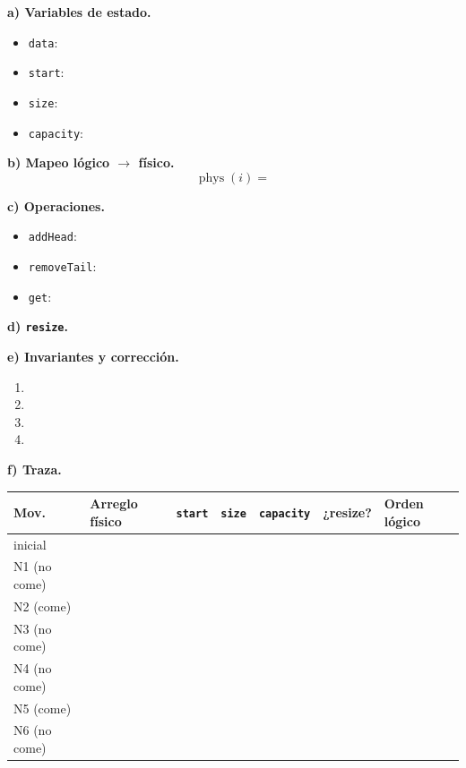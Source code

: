\documentclass[11pt,a4paper]{article}
\newcommand{\phys}{\operatorname{phys}}
\newcommand{\sub}[2]{\medskip\par\noindent\textbf{#1) #2.}\ }
\begin{document}
\sub{a}{Variables de estado}
\begin{itemize}
\item \texttt{data}:
\item \texttt{start}:
\item \texttt{size}:
\item \texttt{capacity}: 
\end{itemize}

\sub{b}{Mapeo lógico $\to$ físico}
\[
\phys(i)=
\]


\sub{c}{Operaciones}
\begin{itemize}
\item \texttt{addHead}:
\item \texttt{removeTail}:
\item \texttt{get}:
\end{itemize}

\sub{d}{\texttt{resize}}


\sub{e}{Invariantes y corrección}
\begin{enumerate}[label=\textbf{S\arabic*.}]
\item
\item
\item
\item
\end{enumerate}


\sub{f}{Traza}
\par\smallskip
\renewcommand{\arraystretch}{1.9}
\begin{tabular}{@{}L{2.3cm}L{4.6cm}c c c L{1.9cm}L{3cm}@{}}
\toprule
Mov. & Arreglo físico & \texttt{start} & \texttt{size} & \texttt{capacity} & ¿resize? & Orden lógico\\
\midrule
inicial      & & & & & & \\
N1 (no come) & & & & & & \\
N2 (come)    & & & & & & \\
N3 (no come) & & & & & & \\
N4 (no come) & & & & & & \\
N5 (come)    & & & & & & \\
N6 (no come) & & & & & & \\
\bottomrule
\end{tabular}
\renewcommand{\arraystretch}{1}
\end{document}
